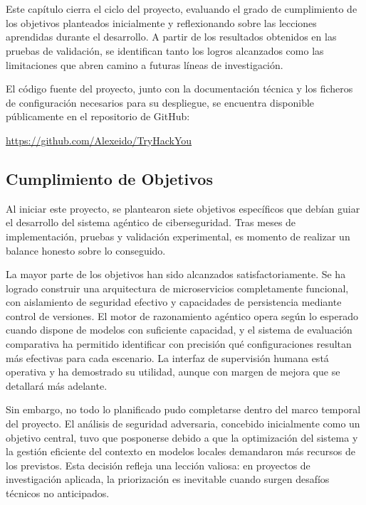 \chapter{\conclusionsname}

Este capítulo cierra el ciclo del proyecto, evaluando el grado de cumplimiento de los objetivos planteados inicialmente y reflexionando sobre las lecciones aprendidas durante el desarrollo. A partir de los resultados obtenidos en las pruebas de validación, se identifican tanto los logros alcanzados como las limitaciones que abren camino a futuras líneas de investigación.

El código fuente del proyecto, junto con la documentación técnica y los ficheros de configuración necesarios para su despliegue, se encuentra disponible públicamente en el repositorio de GitHub:

\begin{center}
\url{https://github.com/Alexeido/TryHackYou}
\end{center}


\section{Cumplimiento de Objetivos}
\label{sec:cumplimiento_objetivos}

Al iniciar este proyecto, se plantearon siete objetivos específicos que debían guiar el desarrollo del sistema agéntico de ciberseguridad. Tras meses de implementación, pruebas y validación experimental, es momento de realizar un balance honesto sobre lo conseguido.

La mayor parte de los objetivos han sido alcanzados satisfactoriamente. Se ha logrado construir una arquitectura de microservicios completamente funcional, con aislamiento de seguridad efectivo y capacidades de persistencia mediante control de versiones. El motor de razonamiento agéntico opera según lo esperado cuando dispone de modelos con suficiente capacidad, y el sistema de evaluación comparativa ha permitido identificar con precisión qué configuraciones resultan más efectivas para cada escenario. La interfaz de supervisión humana está operativa y ha demostrado su utilidad, aunque con margen de mejora que se detallará más adelante.

Sin embargo, no todo lo planificado pudo completarse dentro del marco temporal del proyecto. El análisis de seguridad adversaria, concebido inicialmente como un objetivo central, tuvo que posponerse debido a que la optimización del sistema y la gestión eficiente del contexto en modelos locales demandaron más recursos de los previstos. Esta decisión refleja una lección valiosa: en proyectos de investigación aplicada, la priorización es inevitable cuando surgen desafíos técnicos no anticipados.

